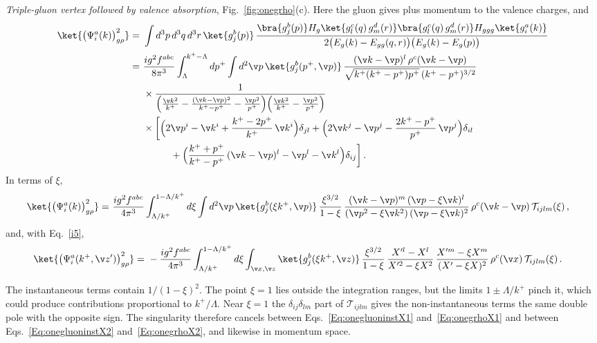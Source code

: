 \emph{Triple-gluon vertex followed by valence absorption}, Fig.~\ref{fig:onegrho}(c). Here the gluon
gives plus momentum to the valence charges, and
\begin{align}\label{onegrho2}
\ket{\big(\Psi^{a}_{i}(k)\big)^{2}_{g\rho}}
=\ &\int d^{3}p\,d^{3}q\,d^{3}r\,\ket{g^{b}_{j}(p)}\,
\frac{\bra{g^{b}_{j}(p)}H_{g}\ket{g^{c}_{l}(q)\,g^{d}_{m}(r)}\bra{g^{c}_{l}(q)\,g^{d}_{m}(r)}H_{ggg}\ket{g^{a}_{i}(k)}}
{2\big(E_{g}(k)-E_{gg}(q,r)\big)\big(E_{g}(k)-E_{g}(p)\big)}\\
=\ &\frac{ig^{2}f^{abc}}{8\pi^{3}}\int_{\Lambda}^{k^{+}-\Lambda}dp^{+}\int d^{2}\v p\,\ket{g^{b}_{j}(p^{+},\v p)}\,
\frac{(\v k-\v p)^{l}\,\rho^{c}(\v k-\v p)}{\sqrt{k^{+}(k^{+}-p^{+})p^{+}}\,(k^{+}-p^{+})^{3/2}}\notag\\
&\times\frac{1}{\Big(\frac{\v k^{2}}{k^{+}}-\frac{(\v k-\v p)^{2}}{k^{+}-p^{+}}-\frac{\v p^{2}}{p^{+}}\Big)
\Big(\frac{\v k^{2}}{k^{+}}-\frac{\v p^{2}}{p^{+}}\Big)}\notag\\
&\times\bigg[\Big(2\v p^{i}-\v k^{i}+\frac{k^{+}-2p^{+}}{k^{+}}\,\v k^{i}\Big)\delta_{jl}
+\Big(2\v k^{j}-\v p^{j}-\frac{2k^{+}-p^{+}}{p^{+}}\,\v p^{j}\Big)\delta_{il}\notag\\
&\hspace{1cm}+\Big(\frac{k^{+}+p^{+}}{k^{+}-p^{+}}\,(\v k-\v p)^{l}-\v p^{l}-\v k^{l}\Big)\delta_{ij}\bigg]\,.\label{onegrho22}
\end{align}
In terms of $\xi$,
\begin{align}\label{onegrho22xi}
\ket{\big(\Psi^{a}_{i}(k)\big)^{2}_{g\rho}}
=\ &\frac{ig^{2}f^{abc}}{4\pi^{3}}\int_{\Lambda/k^{+}}^{1-\Lambda/k^{+}}d\xi\int d^{2}\v p\,
\ket{g^{b}_{j}(\xi k^{+},\v p)}\,\frac{\xi^{3/2}}{1-\xi}\,
\frac{(\v k-\v p)^{m}\,(\v p-\xi\v k)^{l}}{(\v p^{2}-\xi\v k^{2})\,(\v p-\xi\v k)^{2}}\,
\rho^{c}(\v k-\v p)\,\mathcal{T}_{ijlm}(\xi)\,,
\end{align}
and, with Eq.~\eqref{i5},
\begin{align}\label{Eq:onegrhoX2}
\ket{\big(\Psi^{a}_{i}(k^{+},\v z')\big)^{2}_{g\rho}}
=\ &-\frac{ig^{2}f^{abc}}{4\pi^{3}}\int_{\Lambda/k^{+}}^{1-\Lambda/k^{+}}d\xi\int_{\v x,\v z}
\ket{g^{b}_{j}(\xi k^{+},\v z)}\,\frac{\xi^{3/2}}{1-\xi}\,
\frac{X'^{l}-X^{l}}{X'^{2}-\xi X^{2}}\,\frac{X'^{m}-\xi X^{m}}{(X'-\xi X)^{2}}\,
\rho^{c}(\v x)\,\mathcal{T}_{ijlm}(\xi)\,.
\end{align}

The instantaneous terms contain $1/(1-\xi)^{2}$. The point $\xi=1$ lies outside the integration
ranges, but the limits $1\pm\Lambda/k^{+}$ pinch it, which could produce contributions proportional to
$k^{+}/\Lambda$. Near $\xi=1$ the $\delta_{ij}\delta_{lm}$ part of $\mathcal{T}_{ijlm}$ gives the
non-instantaneous terms the same double pole with the opposite sign. The singularity therefore cancels
between Eqs.~\eqref{Eq:onegluoninstX1} and~\eqref{Eq:onegrhoX1} and between
Eqs.~\eqref{Eq:onegluoninstX2} and~\eqref{Eq:onegrhoX2}, and likewise in momentum space.

